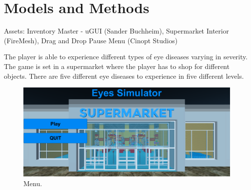 \documentclass{acm_proc_article-sp}
\begin{document}
\section{Models and Methods}

Assets: Inventory Master - uGUI (Sander Buchheim), Supermarket Interior (FireMesh), Drag and Drop Pause Menu (Cinopt Studios)

The player is able to experience different types of eye diseases varying in severity.
%
%
The game is set in a supermarket where the player has to shop for different objects.
There are five different eye diseases to experience in five different levels.

\begin{figure}
    \centering
    \includegraphics[width=\columnwidth]{Menu.png}
    \caption{Menu.}
    \label{fig:menu}
\end{figure}
\end{document}
